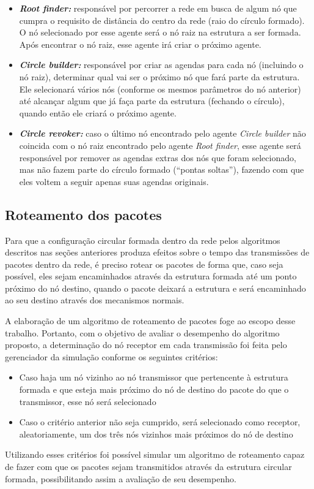 \begin{itemize}
 \item \textbf{\emph{Root finder:}} responsável por percorrer a rede em busca de algum nó que cumpra o requisito de distância do centro da rede (raio do círculo formado). O nó selecionado por esse agente será o nó raiz na estrutura a ser formada. Após encontrar o nó raiz, esse agente irá criar o próximo agente. 
 \item \textbf{\emph{Circle builder:}} responsável por criar as agendas para cada nó (incluindo o nó raiz), determinar qual vai ser o próximo nó que fará parte da estrutura. Ele selecionará vários nós (conforme os mesmos parâmetros do nó anterior) até alcançar algum que já faça parte da estrutura (fechando o círculo), quando então ele criará o próximo agente.
 \item \textbf{\emph{Circle revoker:}} caso o último nó encontrado pelo agente \emph{Circle builder} não coincida com o nó raiz encontrado pelo agente \emph{Root finder}, esse agente será responsável por remover as agendas extras dos nós que foram selecionado, mas não fazem parte do círculo formado (``pontas soltas''), fazendo com que eles voltem a seguir apenas suas agendas originais.
\end{itemize}

\subsection{Roteamento dos pacotes}

Para que a configuração circular formada dentro da rede pelos algoritmos descritos nas seções anteriores produza efeitos sobre o tempo das transmissões de pacotes dentro da rede, é preciso rotear os pacotes de forma que, caso seja possível, eles sejam encaminhados através da estrutura formada até um ponto próximo do nó destino, quando o pacote deixará a estrutura e será encaminhado ao seu destino através dos mecanismos normais. 

A elaboração de um algoritmo de roteamento de pacotes foge ao escopo desse trabalho. Portanto, com o objetivo de avaliar o desempenho do algoritmo proposto, a determinação do nó receptor em cada transmissão foi feita pelo gerenciador da simulação conforme os seguintes critérios:

\begin{itemize}
\item Caso haja um nó vizinho ao nó transmissor que pertencente à estrutura formada e que esteja mais próximo do nó de destino do pacote do que o transmissor, esse nó será selecionado
\item Caso o critério anterior não seja cumprido, será selecionado como receptor, aleatoriamente, um dos três nós vizinhos mais próximos do nó de destino
\end{itemize}

Utilizando esses critérios foi possível simular um algoritmo de roteamento capaz de fazer com que os pacotes sejam transmitidos através da estrutura circular formada, possibilitando assim a avaliação de seu desempenho.



